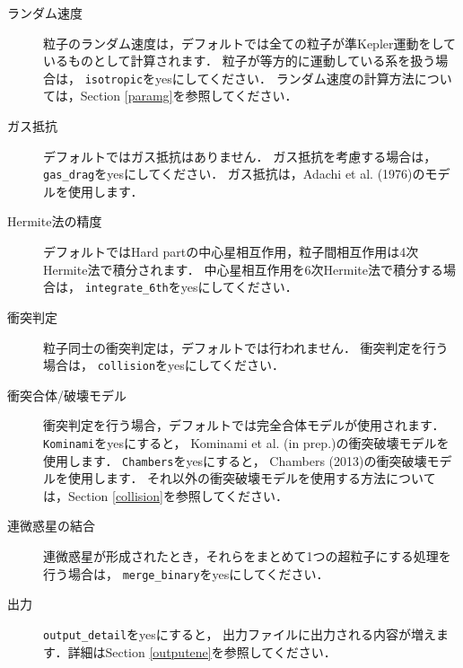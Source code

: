 \documentclass[12pt,a4paper,dvipdfmx]{jsarticle}
\begin{document}
\begin{description}
\item[ランダム速度]
粒子のランダム速度は，デフォルトでは全ての粒子が準Kepler運動をしているものとして計算されます．
粒子が等方的に運動している系を扱う場合は，%
\texttt{isotropic}をyesにしてください．
ランダム速度の計算方法については，Section \ref{paramg}を参照してください．

\item[ガス抵抗]
デフォルトではガス抵抗はありません．
ガス抵抗を考慮する場合は，%
\texttt{gas\_drag}をyesにしてください．
ガス抵抗は，Adachi et al. (1976)のモデルを使用します．


\item[Hermite法の精度]
デフォルトではHard partの中心星相互作用，粒子間相互作用は4次Hermite法で積分されます．
中心星相互作用を6次Hermite法で積分する場合は，%
\texttt{integrate\_6th}をyesにしてください．

\item[衝突判定]
粒子同士の衝突判定は，デフォルトでは行われません．
衝突判定を行う場合は，%
\texttt{collision}をyesにしてください．

\item[衝突合体/破壊モデル]
衝突判定を行う場合，デフォルトでは完全合体モデルが使用されます．
\texttt{Kominami}をyesにすると，
Kominami et al. (in prep.)の衝突破壊モデルを使用します．
\texttt{Chambers}をyesにすると，
Chambers (2013)の衝突破壊モデルを使用します．
それ以外の衝突破壊モデルを使用する方法については，Section \ref{collision}を参照してください．

\item[連微惑星の結合]
連微惑星が形成されたとき，それらをまとめて1つの超粒子にする処理を行う場合は，
\texttt{merge\_binary}をyesにしてください．


\item[出力]
\texttt{output\_detail}をyesにすると，
出力ファイルに出力される内容が増えます．詳細はSection \ref{outputene}を参照してください．


\end{description}
\end{document}
